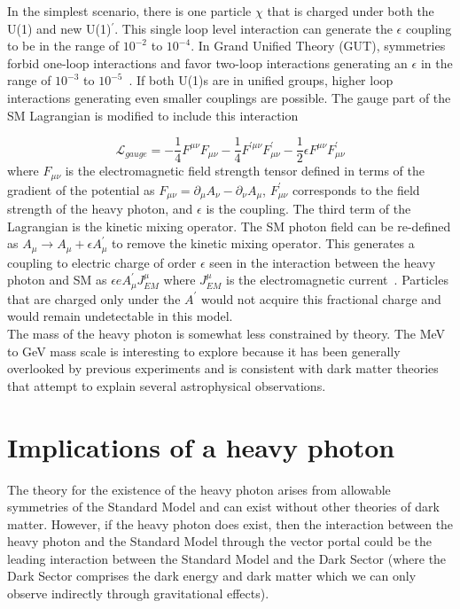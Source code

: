 In the simplest scenario, there is one particle $\chi$ that is charged under both the U(1) and new U(1)$^{\prime}$. This single loop level interaction can generate the $\epsilon$ coupling to be in the range of $10^{-2}$ to $10^{-4}$. In Grand Unified Theory (GUT), symmetries forbid one-loop interactions and favor two-loop interactions generating an $\epsilon$ in the range of $10^{-3}$ to $10^{-5}$~\cite{alexander_dark_2016}. If both U(1)s are in unified groups, higher loop interactions generating even smaller couplings are possible. The gauge part of the SM Lagrangian is modified to include this interaction

\begin{equation}
	\label{eq:lagrangian}
\mathcal{L}_{gauge} = -\dfrac{1}{4}F^{\mu\nu}F_{\mu\nu}-\dfrac{1}{4}
F^{\prime\mu\nu}F^{\prime}_{\mu\nu}-\dfrac{1}{2}\epsilon F^{\mu\nu}F^{\prime}_{\mu\nu}
\end{equation}
where $F_{\mu\nu}$ is the electromagnetic field strength tensor defined in terms of the gradient of the potential as $F_{\mu\nu}=\partial_{\mu}A_{\nu}-\partial_{\nu}A_{\mu}$, $F^{\prime}_{\mu\nu}$ corresponds to the field strength of the heavy photon, and $\epsilon$ is the coupling. The third term of the Lagrangian is the kinetic mixing operator. The SM photon field can be re-defined as $A_{\mu}\rightarrow A_{\mu}+\epsilon A^{\prime}_{\mu}$ to remove the kinetic mixing operator. This generates a coupling to electric charge of order $\epsilon$ seen in the interaction between the heavy photon and SM as $\epsilon e A^{\prime}_{\mu}J^{\mu}_{EM}$ where $J^{\mu}_{EM}$ is the electromagnetic current~\cite{bjorken_new_2009}. Particles that are charged only under the $A^{\prime}$ would not acquire this fractional charge and would remain undetectable in this model. \\
\indent The mass of the heavy photon is somewhat less constrained by theory. The MeV to GeV mass scale is interesting to explore because it has been generally overlooked by previous experiments and is consistent with dark matter theories that attempt to explain several astrophysical observations. 


\section{Implications of a heavy photon}
The theory for the existence of the heavy photon arises from allowable symmetries of the Standard Model and can exist without other theories of dark matter. However, if the heavy photon does exist, then the interaction between the heavy photon and the Standard Model through the vector portal could be  the leading interaction between the Standard Model and the Dark Sector (where the Dark Sector comprises the dark energy and dark matter which we can only observe indirectly through gravitational effects).

